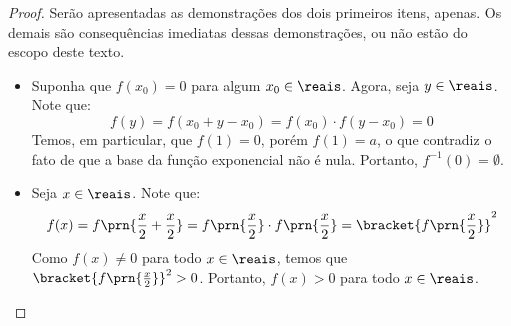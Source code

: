 \begin{proof}
    Serão apresentadas as demonstrações dos dois primeiros itens, apenas. Os demais são consequências 
    imediatas dessas demonstrações, ou não estão do escopo deste texto.
    \begin{itemize}
        \item Suponha que $f(x_0) = 0$ para algum $x_0 \in \reais$.
        Agora, seja $y \in \reais$. Note que:
        $$f(y) = f(x_0 + y - x_0) = f(x_0)\cdot f(y-x_0) = 0$$ 
        Temos, em particular, que $f(1)=0$, porém $f(1) = a$, o que contradiz
        o fato de que a base da função exponencial não é nula. 
        Portanto, $f^{-1}(0) = \emptyset$.

        \item Seja $x \in \reais$. Note que:
        $$f(x) = f\prn{\frac{x}{2} + \frac{x}{2}} = f\prn{\frac{x}{2}}\cdot f\prn{\frac{x}{2}} =\bracket{f\prn{\frac x 2}}^2$$
        Como $f(x) \ne 0$ para todo $x \in \reais$, temos que $\bracket{f\prn{\frac x 2}}^2 > 0$. Portanto, $f(x) > 0$ 
        para todo $x \in \reais$.
    \end{itemize}
\end{proof}